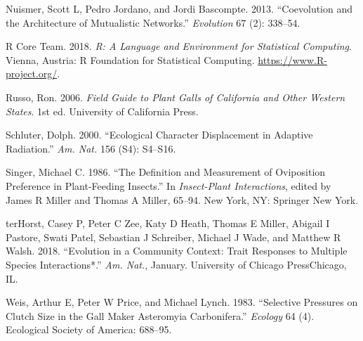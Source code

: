 \documentclass[]{elsarticle} %
\begin{document}
\hypertarget{ref-Nuismer2013}{}
Nuismer, Scott L, Pedro Jordano, and Jordi Bascompte. 2013.
``Coevolution and the Architecture of Mutualistic Networks.''
\emph{Evolution} 67 (2): 338--54.

\hypertarget{ref-R2018}{}
R Core Team. 2018. \emph{R: A Language and Environment for Statistical
Computing}. Vienna, Austria: R Foundation for Statistical Computing.
\url{https://www.R-project.org/}.

\hypertarget{ref-Russo2006}{}
Russo, Ron. 2006. \emph{Field Guide to Plant Galls of California and
Other Western States}. 1st ed. University of California Press.

\hypertarget{ref-Schluter2000}{}
Schluter, Dolph. 2000. ``Ecological Character Displacement in Adaptive
Radiation.'' \emph{Am. Nat.} 156 (S4): S4--S16.

\hypertarget{ref-Singer1986}{}
Singer, Michael C. 1986. ``The Definition and Measurement of Oviposition
Preference in Plant-Feeding Insects.'' In \emph{Insect-Plant
Interactions}, edited by James R Miller and Thomas A Miller, 65--94. New
York, NY: Springer New York.

\hypertarget{ref-TerHorst2018}{}
terHorst, Casey P, Peter C Zee, Katy D Heath, Thomas E Miller, Abigail I
Pastore, Swati Patel, Sebastian J Schreiber, Michael J Wade, and Matthew
R Walsh. 2018. ``Evolution in a Community Context: Trait Responses to
Multiple Species Interactions*.'' \emph{Am. Nat.}, January. University
of Chicago PressChicago, IL.

\hypertarget{ref-Weis1983}{}
Weis, Arthur E, Peter W Price, and Michael Lynch. 1983. ``Selective
Pressures on Clutch Size in the Gall Maker Asteromyia Carbonifera.''
\emph{Ecology} 64 (4). Ecological Society of America: 688--95.
\end{document}

